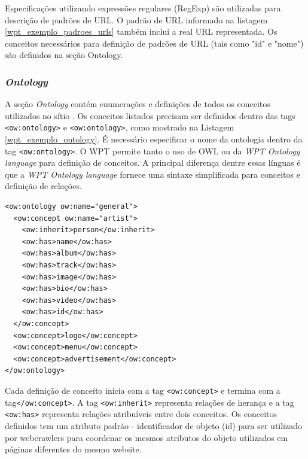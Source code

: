 Especificações utilizando expressões regulares (RegExp) são utilizadas para descrição de padrões de URL. O padrão de URL informado na listagem \ref{wpt_exemplo_padroes_urls} também inclui a real URL representada. Os conceitos necessários para definição de padrões de URL (tais como "id" e "nome") são definidos na seção Ontology.

\subsubsection{\textit{Ontology}}

A seção \textit{Ontology} contém enumerações e definições de todos os conceitos utilizados no sítio \cite{wpt}. Os conceitos listados precisam ser definidos dentro das tags \texttt{<ow:ontology>} e \texttt{<ow:ontology>}, como mostrado na Listagem \ref{wpt_exemplo_ontology}. É necessário especificar o nome da ontologia dentro da tag \texttt{<ow:ontology>}. O WPT permite tanto o uso de OWL ou da \emph{WPT Ontology language} para definição de conceitos. A principal diferença dentre essas línguas é que a \emph{WPT Ontology language} fornece uma sintaxe simplificada para conceitos e definição de relações.

\begin{lstlisting}[label=wpt_exemplo_ontology]
<ow:ontology ow:name="general">
  <ow:concept ow:name="artist">
    <ow:inherit>person</ow:inherit>
    <ow:has>name</ow:has>
    <ow:has>album</ow:has>
    <ow:has>track</ow:has>
    <ow:has>image</ow:has>
    <ow:has>bio</ow:has>
    <ow:has>video</ow:has>
    <ow:has>id</ow:has>
  </ow:concept>
  <ow:concept>logo</ow:concept>
  <ow:concept>menu</ow:concept>
  <ow:concept>advertisement</ow:concept>
</ow:ontology>
\end{lstlisting}

Cada definição de conceito inicia com a tag \texttt{<ow:concept>} e termina com a tag\texttt{</ow:concept>}. A tag \texttt{<ow:inherit>} representa relações de herança e a tag \texttt{<ow:has>} representa relações atribuíveis entre dois conceitos. Os conceitos definidos tem um atributo padrão - identificador de objeto (id) para ser utilizado por \glspl{webcrawler} para coordenar os mesmos atributos do objeto utilizados em páginas diferentes do mesmo website.

